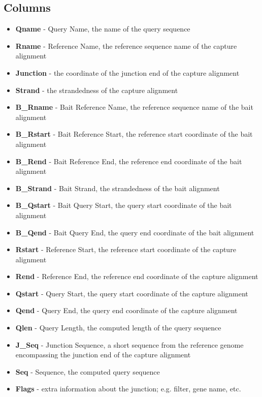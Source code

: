 \documentclass{article}
\begin{document}
\subsection{Columns}
\begin{itemize}
  \item \textbf{Qname} - Query Name, the name of the query sequence
  \item \textbf{Rname} - Reference Name, the reference sequence name of the capture alignment
  \item \textbf{Junction} - the coordinate of the junction end of the capture alignment
  \item \textbf{Strand} - the strandedness of the capture alignment 
  \item \textbf{B\_Rname} - Bait Reference Name, the reference sequence name of the bait alignment
  \item \textbf{B\_Rstart} - Bait Reference Start, the reference start coordinate of the bait alignment
  \item \textbf{B\_Rend} - Bait Reference End, the reference end coordinate of the bait alignment
  \item \textbf{B\_Strand} - Bait Strand, the strandedness of the bait alignment
  \item \textbf{B\_Qstart} - Bait Query Start, the query start coordinate of the bait alignment
  \item \textbf{B\_Qend} - Bait Query End, the query end coordinate of the bait alignment
  \item \textbf{Rstart} - Reference Start, the reference start coordinate of the capture alignment
  \item \textbf{Rend} - Reference End, the reference end coordinate of the capture alignment
  \item \textbf{Qstart} - Query Start, the query start coordinate of the capture alignment
  \item \textbf{Qend} - Query End, the query end coordinate of the capture alignment
  \item \textbf{Qlen} - Query Length, the computed length of the query sequence
  \item \textbf{J\_Seq} - Junction Sequence, a short sequence from the reference genome encompassing the junction end of the capture alignment
  \item \textbf{Seq} - Sequence, the computed query sequence
  \item \textbf{Flags} - extra information about the junction; e.g. filter, gene name, etc.
\end{itemize}
\end{document}
